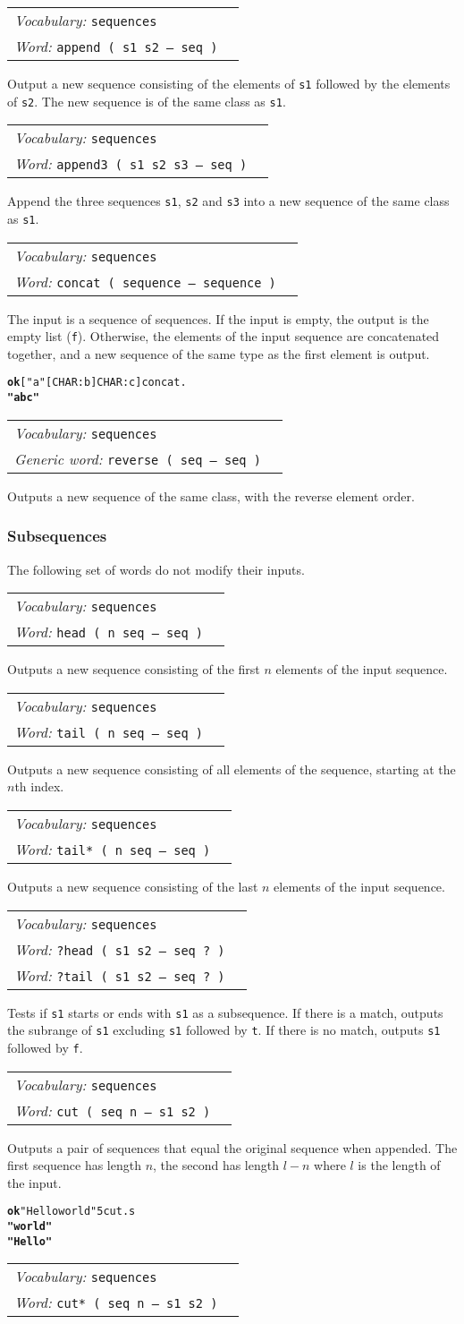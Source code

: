 \documentclass{book}
\newcommand{\tto}{\symbol{123}}
\newcommand{\ttc}{\symbol{125}}
\newcommand{\vocabulary}[1]{\emph{Vocabulary:} \texttt{#1}&\\}
\newcommand{\ordinaryword}[2]{\index{\texttt{#1}}\emph{Word:} \texttt{#2}&\\}
\newcommand{\genericword}[2]{\index{\texttt{#1}}\emph{Generic word:} \texttt{#2}&\\}
\newcommand{\wordtable}[1]{


\begin{tabularx}{12cm}{lX}
\hline
#1
\hline
\end{tabularx}

}
\begin{document}
\wordtable{
\vocabulary{sequences}
\ordinaryword{append}{append ( s1 s2 -- seq )}
}
Output a new sequence consisting of the elements of \texttt{s1} followed by the elements of \texttt{s2}. The new sequence is of the same class as \texttt{s1}.
\wordtable{
\vocabulary{sequences}
\ordinaryword{append3}{append3 ( s1 s2 s3 -- seq )}
}
Append the three sequences \texttt{s1}, \texttt{s2} and \texttt{s3} into a new sequence of the same class as \texttt{s1}.
\wordtable{
\vocabulary{sequences}
\ordinaryword{concat}{concat ( sequence -- sequence )}
}
The input is a sequence of sequences. If the input is empty, the output is the empty list (\texttt{f}). Otherwise, the elements of the input sequence are concatenated together, and a new sequence of the same type as the first element is output.
\begin{alltt}
\textbf{ok} [ "a" [ CHAR: b ] \tto CHAR: c \ttc ] concat .
\textbf{"abc"}
\end{alltt}
\wordtable{
\vocabulary{sequences}
\genericword{reverse}{reverse ( seq -- seq )}
}
Outputs a new sequence of the same class, with the reverse element order.

\subsubsection{Subsequences}\label{subseq}

The following set of words do not modify their inputs.

\wordtable{
\vocabulary{sequences}
\ordinaryword{head}{head~( n seq -- seq )}
}
Outputs a new sequence consisting of the first $n$ elements of the input sequence.
\wordtable{
\vocabulary{sequences}
\ordinaryword{tail}{tail~( n seq -- seq )}
}
Outputs a new sequence consisting of all elements of the sequence, starting at the $n$th index.
\wordtable{
\vocabulary{sequences}
\ordinaryword{tail*}{tail*~( n seq -- seq )}
}
Outputs a new sequence consisting of the last $n$ elements of the input sequence.
\wordtable{
\vocabulary{sequences}
\ordinaryword{?head}{?head~( s1 s2 -- seq ?~)}
\ordinaryword{?tail}{?tail~( s1 s2 -- seq ?~)}
}
Tests if \texttt{s1} starts or ends with \texttt{s1} as a subsequence. If there is a match, outputs the subrange of \texttt{s1} excluding \texttt{s1} followed by \texttt{t}. If there is no match, outputs \texttt{s1} followed by \texttt{f}.
\wordtable{
\vocabulary{sequences}
\ordinaryword{cut}{cut ( seq n -- s1 s2 )}
}
Outputs a pair of sequences that equal the original sequence when appended. The first sequence has length $n$, the second has length $l-n$ where $l$ is the length of the input.
\begin{alltt}
\textbf{ok} "Hello world" 5 cut .s
\textbf{" world"
"Hello"}
\end{alltt}
\wordtable{
\vocabulary{sequences}
\ordinaryword{cut*}{cut* ( seq n -- s1 s2 )}
}
\end{document}
